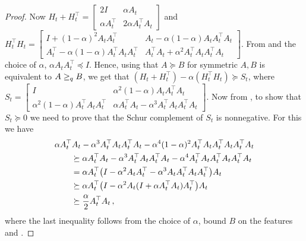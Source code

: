 \begin{proof}
Now 
$H_t+H_t^\top
	=\left[
		\begin{matrix} 2I & \alpha A_t\\ \alpha A_t^\top & 2\alpha A_t^\top A_t\end{matrix}\right]$ 
and $H_t^\top H_t=\left[\begin{matrix} I+(1-\alpha)^2A_tA_t^\top & A_t-\alpha(1-\alpha)A_tA_t^\top A_t\\ A_t^\top-\alpha(1-\alpha)A_t^\top A_t A_t^\top & A_t^\top A_t+\alpha^2A_t^\top A_t A_t^\top A_t\end{matrix}\right]$.  
From  and the choice of $\alpha$, $\alpha A_t A_t^\top \preceq I$. Hence, using that $A\succeq B$ for symmetric $A,B$ is equivalent to $A \geq_q B$, we get that
 $(H_t+H_t^\top) -\alpha(H_t^\top H_t) \succeq S_t$, 
 where $S_t=\left[\begin{matrix}I &\alpha^2(1-\alpha) A_tA_t^\top A_t\\ \alpha^2(1-\alpha) A_t^\top A_t A_t^\top &\alpha A_t^\top A_t-\alpha^3A_t^\top A_tA_t^\top A_t\end{matrix}\right]$. Now from , to show that $S_t\succeq 0$ we need to prove that the Schur complement of $S_t$ is nonnegative. For this we have
\begin{align*}
\MoveEqLeft 
\alpha A_t^\top A_t -\alpha^3A_t^\top A_t A_t^\top A_t - \alpha^4(1-\alpha)^2A_t^\top A_t A_t^\top A_t A_t^\top A_t\\
&\succeq
\alpha A_t^\top A_t -\alpha^3A_t^\top A_t A_t^\top A_t - \alpha^4 A_t^\top A_t A_t^\top A_t A_t^\top A_t\\
&=\alpha A_t^\top\big(I-\alpha^2 A_tA_t^\top-\alpha^3A_tA_t^\top A_tA_t^\top\big)A_t\\
&\succeq \alpha A_t^\top\big(I-\alpha^2 A_t(I+\alpha A_t^\top A_t)A_t^\top\big)A_t\\
&\succeq \frac{\alpha}{2} A_t^\top A_t\,,
\end{align*}
where the last inequality follows from the choice of $\alpha$, bound $B$ on the features and .
\end{proof}
